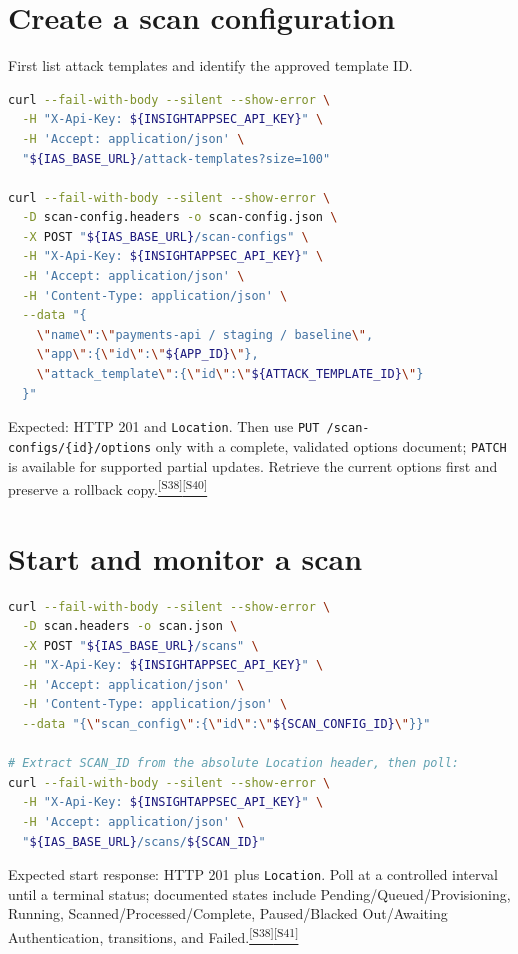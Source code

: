 \documentclass[11pt,letterpaper,oneside]{scrreprt}
\newcommand{\src}[1]{\hyperref[src:#1]{\textsuperscript{\color{R7Orange}[#1]}}}
\newcommand{\code}[1]{\texttt{#1}}
\begin{document}
\section{Create a scan configuration}
First list attack templates and identify the approved template ID.
\begin{lstlisting}[language=bash]
curl --fail-with-body --silent --show-error \
  -H "X-Api-Key: ${INSIGHTAPPSEC_API_KEY}" \
  -H 'Accept: application/json' \
  "${IAS_BASE_URL}/attack-templates?size=100"

curl --fail-with-body --silent --show-error \
  -D scan-config.headers -o scan-config.json \
  -X POST "${IAS_BASE_URL}/scan-configs" \
  -H "X-Api-Key: ${INSIGHTAPPSEC_API_KEY}" \
  -H 'Accept: application/json' \
  -H 'Content-Type: application/json' \
  --data "{
    \"name\":\"payments-api / staging / baseline\",
    \"app\":{\"id\":\"${APP_ID}\"},
    \"attack_template\":{\"id\":\"${ATTACK_TEMPLATE_ID}\"}
  }"
\end{lstlisting}
Expected: HTTP 201 and \code{Location}. Then use \code{PUT /scan-configs/\{id\}/options} only with a complete, validated options document; \code{PATCH} is available for supported partial updates. Retrieve the current options first and preserve a rollback copy.\src{S38}\src{S40}

\section{Start and monitor a scan}
\begin{lstlisting}[language=bash]
curl --fail-with-body --silent --show-error \
  -D scan.headers -o scan.json \
  -X POST "${IAS_BASE_URL}/scans" \
  -H "X-Api-Key: ${INSIGHTAPPSEC_API_KEY}" \
  -H 'Accept: application/json' \
  -H 'Content-Type: application/json' \
  --data "{\"scan_config\":{\"id\":\"${SCAN_CONFIG_ID}\"}}"

# Extract SCAN_ID from the absolute Location header, then poll:
curl --fail-with-body --silent --show-error \
  -H "X-Api-Key: ${INSIGHTAPPSEC_API_KEY}" \
  -H 'Accept: application/json' \
  "${IAS_BASE_URL}/scans/${SCAN_ID}"
\end{lstlisting}
Expected start response: HTTP 201 plus \code{Location}. Poll at a controlled interval until a terminal status; documented states include Pending/Queued/Provisioning, Running, Scanned/Processed/Complete, Paused/Blacked Out/Awaiting Authentication, transitions, and Failed.\src{S38}\src{S41}
\end{document}
